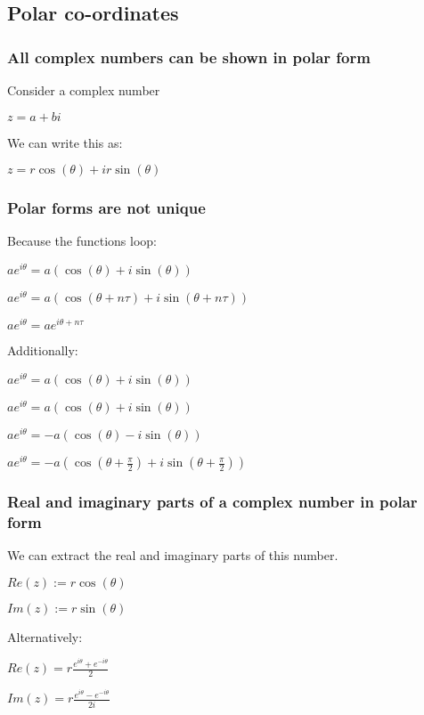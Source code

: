 
\subsection{Polar co-ordinates}

\subsubsection{All complex numbers can be shown in polar form}

Consider a complex number

$z=a+bi$

We can write this as:

\(z=r\cos(\theta ) + ir\sin(\theta )\)

\subsubsection{Polar forms are not unique}

Because the functions loop:

$ae^{i\theta }=a(\cos(\theta )+i\sin(\theta ))$

$ae^{i\theta }=a(\cos(\theta +n\tau )+i\sin(\theta +n\tau ))$

$ae^{i\theta }= ae^{i\theta +n\tau}$

Additionally:

$ae^{i\theta }=a(\cos(\theta )+i\sin(\theta ))$

$ae^{i\theta }=a(\cos(\theta )+i\sin(\theta ))$

$ae^{i\theta }=-a(\cos(\theta )-i\sin(\theta ))$

$ae^{i\theta }=-a(\cos(\theta +\frac{\pi }{2})+i\sin(\theta +\frac{\pi }{2}))$

\subsubsection{Real and imaginary parts of a complex number in polar form}

We can extract the real and imaginary parts of this number.

$Re(z):=r\cos (\theta )$

$Im(z):=r\sin (\theta )$

Alternatively:

$Re(z)=r\frac{e^{i\theta }+e^{-i\theta }}{2}$

$Im(z)=r\frac{e^{i\theta }-e^{-i\theta }}{2i}$

